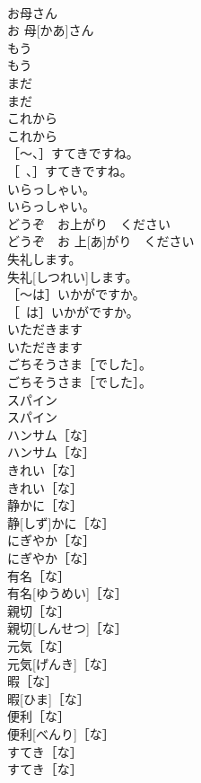 \documentclass[8pt]{extreport}
\begin{document}
\begin{CJK}{UTF8}{min}
\\	お母さん	
\\	お 母[かあ]さん	
\\	もう	
\\	もう	
\\	まだ	
\\	まだ	
\\	これから	
\\	これから	
\\	［～、］すてきですね。	
\\	［~、］すてきですね。	
\\	いらっしゃい。	
\\	いらっしゃい。	
\\	どうぞ　お上がり　ください	
\\	どうぞ　お 上[あ]がり　ください	
\\	失礼します。	
\\	失礼[しつれい]します。	
\\	［～は］いかがですか。	
\\	［~は］いかがですか。	
\\	いただきます	
\\	いただきます	
\\	ごちそうさま［でした］。	
\\	ごちそうさま［でした］。	
\\	スパイン	
\\	スパイン	
\\	ハンサム［な］	
\\	ハンサム［な］	
\\	きれい［な］	
\\	きれい［な］	
\\	静かに［な］	
\\	静[しず]かに［な］	
\\	にぎやか［な］	
\\	にぎやか［な］	
\\	有名［な］	
\\	有名[ゆうめい]［な］	
\\	親切［な］	
\\	親切[しんせつ]［な］	
\\	元気［な］	
\\	元気[げんき]［な］	
\\	暇［な］	
\\	暇[ひま]［な］	
\\	便利［な］	
\\	便利[べんり]［な］	
\\	すてき［な］	
\\	すてき［な］	

\end{CJK}
\end{document}
